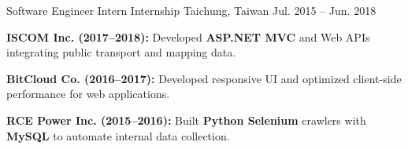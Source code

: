 \begin{cventries}
  \cventry
    {Software Engineer Intern} %
    {Internship} %
    {Taichung, Taiwan} %
    {Jul. 2015 -- Jun. 2018} %
    {
      \begin{cvitems}
        \item {\textbf{ISCOM Inc. (2017–2018):} Developed \textbf{ASP.NET MVC} and Web APIs integrating public transport and mapping data.}
        \item {\textbf{BitCloud Co. (2016–2017):} Developed responsive UI and optimized client-side performance for web applications.}
        \item {\textbf{RCE Power Inc. (2015–2016):} Built \textbf{Python Selenium} crawlers with \textbf{MySQL} to automate internal data collection.}
       \end{cvitems}
    }
\end{cventries}


